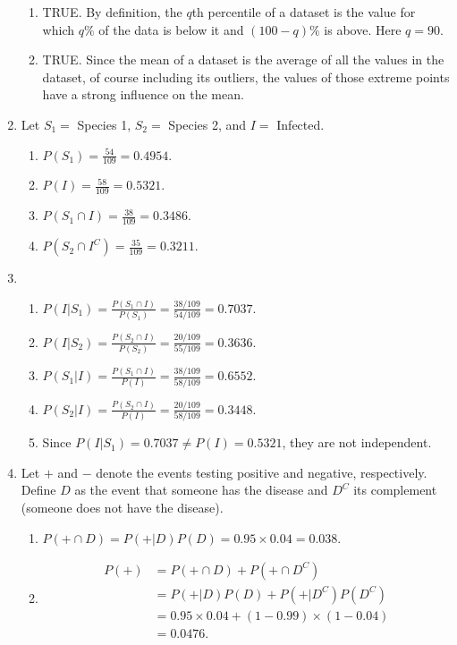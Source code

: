 \documentclass{article}
\begin{document}
\begin{enumerate}
\begin{enumerate}
		\item TRUE. By definition, the $q$th percentile of a dataset is the value for which $q\%$ of the data is below it and $(100-q)\%$ is above. Here $q=90$.
		\item TRUE. Since the mean of a dataset is the average of all the values in the dataset, of course including its outliers, the values of those extreme points have a strong influence on the mean.
    \end{enumerate}
    \item Let $S_1=$ Species 1, $S_2=$ Species 2, and $I=$ Infected.
    \begin{enumerate}
        \item $P(S_1)=\frac{54}{109}=0.4954.$
        \item $P(I)=\frac{58}{109}=0.5321.$
        \item $P(S_1\cap I)=\frac{38}{109}=0.3486.$
        \item $P(S_2\cap I^C)=\frac{35}{109}=0.3211.$
    \end{enumerate}
    \item 
    \begin{enumerate}
        \item $P(I|S_1)=\frac{P(S_1\cap I)}{P(S_1)}=\frac{38/109}{54/109}=0.7037.$
        \item $P(I|S_2)=\frac{P(S_2\cap I)}{P(S_2)}=\frac{20/109}{55/109}=0.3636.$
        \item $P(S_1|I)=\frac{P(S_1\cap I)}{P(I)}=\frac{38/109}{58/109}=0.6552.$
        \item $P(S_2|I)=\frac{P(S_2\cap I)}{P(I)}=\frac{20/109}{58/109}=0.3448.$
        \item Since $P(I|S_1)=0.7037\neq P(I)=0.5321$, they are not independent.
    \end{enumerate}
    \item Let $+$ and $-$ denote the events testing positive and negative, respectively. Define $D$ as the event that someone has the disease and $D^C$ its complement (someone does not have the disease).
    \begin{enumerate}
        \item $P(+\cap D)=P(+|D)P(D)=0.95\times0.04=0.038.$
        \item 
        \begin{align*}
        P(+)&=P(+\cap D)+P(+\cap D^C)\\&=P(+|D)P(D)+P(+|D^C)P(D^C)\\&=0.95\times0.04+(1-0.99)\times(1-0.04)\\&=0.0476.

\end{align*}
\end{enumerate}
\end{enumerate}
\end{document}
